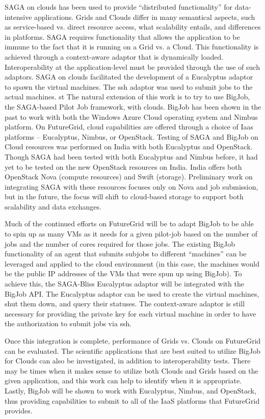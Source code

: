 \documentclass[]{paper}
\begin{document}
SAGA on clouds has been used to provide %
``distributed functionality'' for data-intensive applications. Grids and Clouds differ in many semantical aspects, such as service-based vs. direct resource access, what scalability entails, and differences in platforms. SAGA requires functionality that allows the application to be immune to the fact that it is running on a Grid vs. a Cloud. This functionality is achieved through a context-aware adaptor that is dynamically loaded. Interoperability at the application-level must be provided through the use of such adaptors. SAGA on clouds facilitated the development of a Eucalyptus adaptor to spawn the virtual machines. The ssh adaptor was used to submit jobs to the actual machines. 
st
The natural extension of this work is to try to use BigJob, the SAGA-based Pilot Job framework, with clouds. BigJob has been shown in the past to work with both the Windows Azure Cloud operating system and Nimbus platform. On FutureGrid, cloud capabilities are offered through a choice of Iaas platforms -- Eucalyptus, Nimbus, or OpenStack. Testing of SAGA and BigJob on Cloud resources was performed on India with both Eucalyptus and OpenStack. Though SAGA had been tested with both Eucalyptus and Nimbus before, it had yet to be tested on the new OpenStack resources on India. India offers both OpenStack Nova (compute resources) and Swift (storage). Preliminary work on integrating SAGA with these resources focuses only on Nova and job submission, but in the future, the focus will shift to cloud-based storage to support both scalability and data exchanges.

Much of the continued efforts on FutureGrid will be to adapt BigJob to be able to spin up as many VMs as it needs for a given pilot-job based on the number of jobs and the number of cores required for those jobs. The existing BigJob functionality of an agent that submits subjobs to different ``machines'' can be leveraged and applied to the cloud environment (in this case, the machines would be the public IP addresses of the VMs that were spun up using BigJob). To achieve this, the SAGA-Bliss Eucalyptus adaptor will be integrated with the BigJob API. The Eucalyptus adaptor can be used to create the virtual machines, shut them down, and query their statuses. The context-aware adaptor is still necessary for providing the private key for each virtual machine in order to have the authorization to submit jobs via ssh.

Once this integration is complete, performance of Grids vs. Clouds on FutureGrid can be evaluated. The scientific applications that are best suited to utilize BigJob for Clouds can also be investigated, in addition to interoperability tests. There may be times when it makes sense to utilize both Clouds and Grids based on the given application, and this work can help to identify when it is appropriate. Lastly, BigJob will be shown to work with Eucalyptus, Nimbus, and OpenStack, thus providing capabilities to submit to all of the IaaS platforms that FutureGrid provides.
\end{document}
